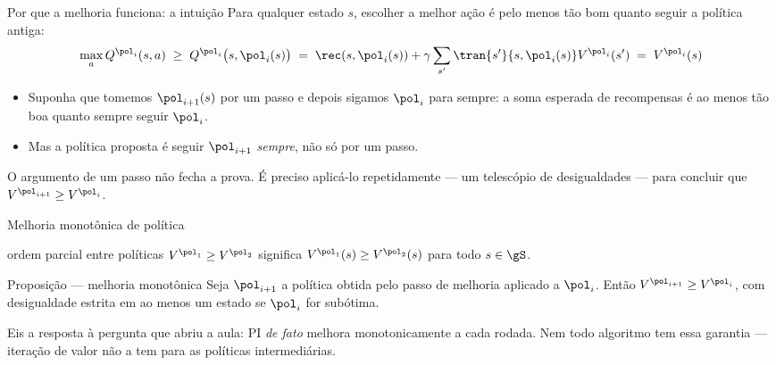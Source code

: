 \documentclass[aspectratio=169, 11pt]{beamer}
\begin{document}
\begin{frame}{Por que a melhoria funciona: a intuição}
  Para qualquer estado $s$, escolher a melhor ação é pelo menos tão bom quanto seguir
  a política antiga:
  \[
    \max_{a} Q^{\pol_i}(s,a) \;\ge\; Q^{\pol_i}\bigl(s, \pol_i(s)\bigr)
    \;=\; \rec(s,\pol_i(s)) + \gamma \sum_{s'} \tran{s'}{s,\pol_i(s)} V^{\pol_i}(s')
    \;=\; V^{\pol_i}(s)
  \]
  \begin{itemize}\setlength{\itemsep}{0.3ex}
    \item Suponha que tomemos $\pol_{i+1}(s)$ \alert{por um passo} e depois sigamos
          $\pol_i$ para sempre: a soma esperada de recompensas é ao menos tão boa
          quanto sempre seguir $\pol_i$.
    \item \alert{Mas} a política proposta é seguir $\pol_{i+1}$ \emph{sempre}, não só
          por um passo.
  \end{itemize}
  \begin{alertabox}
    O argumento de um passo não fecha a prova. É preciso aplicá-lo repetidamente ---
    um telescópio de desigualdades --- para concluir que $V^{\pol_{i+1}} \ge V^{\pol_i}$.
  \end{alertabox}
\end{frame}

\begin{frame}{Melhoria monotônica de política}
  \begin{defbox}[fontupper=\small]{ordem parcial entre políticas}
    $V^{\pol_1} \ge V^{\pol_2}$ significa $V^{\pol_1}(s) \ge V^{\pol_2}(s)$
    para \alert{todo} $s \in \gS$.
  \end{defbox}
  \begin{teobox}{Proposição --- melhoria monotônica}
    Seja $\pol_{i+1}$ a política obtida pelo passo de melhoria aplicado a $\pol_i$. Então
    $V^{\pol_{i+1}} \ge V^{\pol_i}$, com desigualdade \alert{estrita} em ao menos um
    estado se $\pol_i$ for subótima.
  \end{teobox}
  \begin{ideiabox}
    Eis a resposta à pergunta que abriu a aula: PI \emph{de fato} melhora monotonicamente
    a cada rodada. Nem todo algoritmo tem essa garantia --- iteração de valor não a tem
    para as políticas intermediárias.
  \end{ideiabox}
\end{frame}
\end{document}
